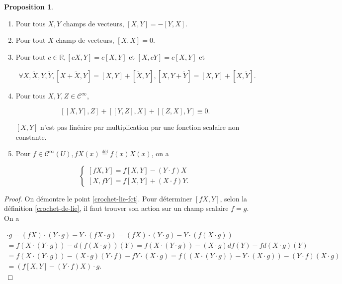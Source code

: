 \documentclass[french]{article}
\theoremstyle{definition}
\newtheorem{protoproposition}{Proposition}[section]
\newenvironment{prop}
    {\colorlet{shadecolor}{blue!5}\begin{shaded}\begin{protoproposition}}
    {\end{protoproposition}\end{shaded}}
\begin{document}
\begin{prop}

  \

  \begin{enumerate}
    \item Pour tous \(X,Y\) champs de vecteurs, \([X,Y] = -[Y,X]\).
    \item Pour tout \(X\) champ de vecteurs, \([X,X] = 0\).
    \item Pour tout \(c \in \mathbb{R}, [cX,Y] = c[X,Y]\) et \([X,cY] = c[X,Y]\) et

    \begin{gather*}
      \forall X, \widetilde{X}, Y, \widetilde{Y}, [X+ \widetilde{X}, Y] = [X,Y]+ [\widetilde{X}, Y], [X,Y + \widetilde{Y}] = [X,Y] + [X,\widetilde{Y}].
    \end{gather*}

    \item Pour tous \(X,Y,Z \in \mathcal{C}^{\infty}\),

    \[[[X,Y], Z] + [[Y,Z],X]+ [[Z,X],Y] \equiv 0.\]

    {\selectfont{}\relax} \([X,Y]\) n'est pas linéaire par multiplication par une fonction scalaire non constante.

    \item \label{crochet-lie-fct} Pour \(f \in \mathcal{C}^{\infty}(U), f X(x) \stackrel{\text{déf}}{=}f(x)X(x)\), on a

    \[\begin{cases}
      [fX,Y] = f [X,Y]-(Y \cdot f)X \\
      [X,f Y] = f[X,Y] + (X \cdot f)Y.
    \end{cases}\]
  \end{enumerate}
\end{prop}

\begin{proof}
  On démontre le point \ref{crochet-lie-fct}. Pour d\'eterminer $[fX, Y]$, selon la d\'efinition \ref{crochet-de-lie}, il faut trouver son action sur un champ scalaire $f=g$. On a

  \begin{gather*}
    [fX,Y]\cdot g = (fX) \cdot (Y \cdot g)  - Y \cdot(f X \cdot g) = (f X) \cdot (Y \cdot g) - Y \cdot (f (X \cdot g)) \\
    = f(X \cdot(Y \cdot g)) - d(f(X \cdot g))(Y)
    = f(X \cdot(Y \cdot g)) - (X \cdot g)d f(Y) - f d (X \cdot g)(Y)  \\ = f(X \cdot(Y \cdot g)) - (X \cdot g)(Y \cdot f) - f Y \cdot (X \cdot g)
    = f((X \cdot (Y \cdot g)) - Y \cdot (X \cdot g))- (Y \cdot f)(X \cdot g)\\  = (f [X,Y] - (Y \cdot f)X) \cdot g.
  \end{gather*}
\end{proof}
\end{document}
